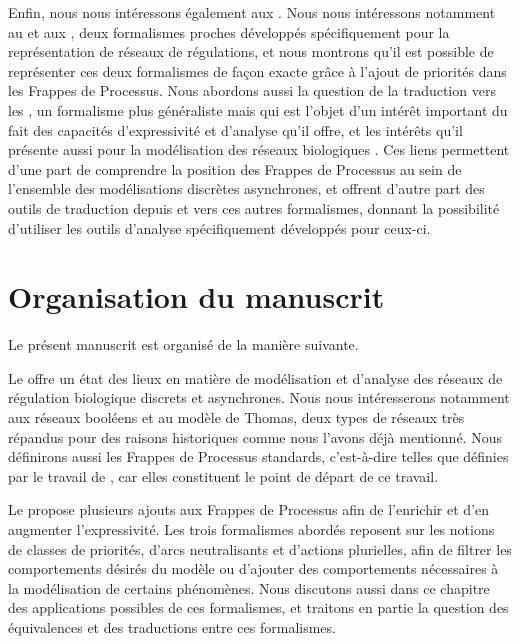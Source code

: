 Enfin, nous nous intéressons également aux .
Nous nous intéressons notamment au  et aux ,
deux formalismes proches
développés spécifiquement pour la représentation de réseaux de régulations,
et nous montrons qu'il est possible de représenter ces deux formalismes de façon exacte
grâce à l'ajout de priorités dans les Frappes de Processus.
Nous abordons aussi la question de la traduction vers les ,
un formalisme plus généraliste mais qui est l'objet d'un intérêt important du fait des
capacités d'expressivité et d'analyse qu'il offre,
et les intérêts qu'il présente aussi pour la modélisation des réseaux biologiques
\cite{petri1962kommunikation,Chaouiya07petrinet}.
Ces liens permettent d'une part de comprendre la position des Frappes de Processus au sein
de l'ensemble des modélisations discrètes asynchrones,
et offrent d'autre part des outils de traduction depuis et vers ces autres formalismes,
donnant la possibilité d'utiliser les outils d'analyse spécifiquement développés pour ceux-ci.








\section{Organisation du manuscrit}

Le présent manuscrit est organisé de la manière suivante.

Le  offre un état des lieux en matière de modélisation et d'analyse
des réseaux de régulation biologique discrets et asynchrones.
Nous nous intéresserons notamment aux réseaux booléens et au modèle de Thomas,
deux types de réseaux très répandus pour des raisons historiques
comme nous l'avons déjà mentionné.
Nous définirons aussi les Frappes de Processus standards,
c'est-à-dire telles que définies par le travail de ,
car elles constituent le point de départ de ce travail.

Le  propose plusieurs ajouts aux Frappes de Processus afin de l'enrichir
et d'en augmenter l'expressivité.
Les trois formalismes abordés reposent sur les notions de classes de priorités,
d'arcs neutralisants et d'actions plurielles,
afin de filtrer les comportements désirés du modèle
ou d'ajouter des comportements nécessaires à la modélisation de certains phénomènes.
Nous discutons aussi dans ce chapitre des applications possibles de ces formalismes,
et traitons en partie la question des équivalences et des traductions entre ces formalismes.

